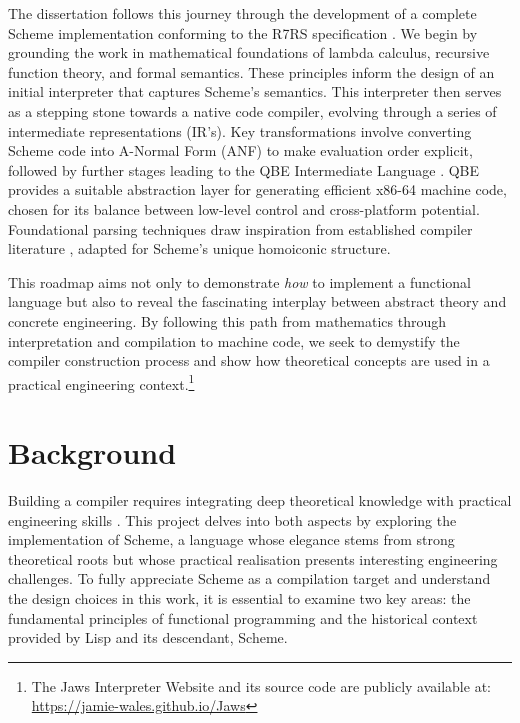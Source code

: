 \documentclass[final]{cmpreport_02}
\begin{document}
The dissertation follows this journey through the development of a complete Scheme implementation conforming to the R7RS specification \cite{r7rs}. We begin by grounding the work in mathematical foundations of lambda calculus, recursive function theory, and formal semantics. These principles inform the design of an initial interpreter that captures Scheme's semantics. This interpreter then serves as a stepping stone towards a native code compiler, evolving through a series of intermediate representations (IR's). Key transformations involve converting Scheme code into A-Normal Form (ANF) \cite{flanagan1993essence} to make evaluation order explicit, followed by further stages leading to the QBE Intermediate Language \cite{qbe_il}. QBE provides a suitable abstraction layer for generating efficient x86-64 machine code, chosen for its balance between low-level control and cross-platform potential. Foundational parsing techniques draw inspiration from established compiler literature \cite{aho2006compilers}, adapted for Scheme's unique homoiconic structure.\newline

This roadmap aims not only to demonstrate \emph{how} to implement a functional language but also to reveal the fascinating interplay between abstract theory and concrete engineering. By following this path from mathematics through interpretation and compilation to machine code, we seek to demystify the compiler construction process and show how theoretical concepts are used in a practical engineering context.\footnote{The Jaws Interpreter Website and its source code are publicly available at: \url{https://jamie-wales.github.io/Jaws}} \newline

\section{Background}
Building a compiler requires integrating deep theoretical knowledge with practical engineering skills \cite{grune2012modern}. This project delves into both aspects by exploring the implementation of Scheme, a language whose elegance stems from strong theoretical roots but whose practical realisation presents interesting engineering challenges. To fully appreciate Scheme as a compilation target and understand the design choices in this work, it is essential to examine two key areas: the fundamental principles of functional programming and the historical context provided by Lisp and its descendant, Scheme.
\end{document}
